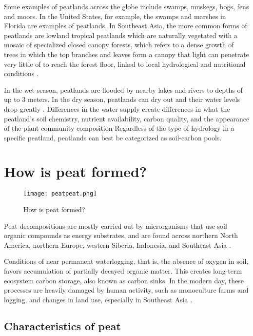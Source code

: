Some examples of peatlands across the globe include swamps, muskegs, bogs, fens and moors. In the United States, for example, the swamps and marshes in Florida are examples of peatlands. In Southeast Asia, the more common forms of peatlands are lowland tropical peatlands which are naturally vegetated with a mosaic of specialized closed canopy forests, which refers to a dense growth of trees in which the top branches and leaves form a canopy that light can penetrate very little of to reach the forest floor, linked to local hydrological and nutritional conditions \citep{chokkalingam2005fire}. 

In the wet season, peatlands are flooded by nearby lakes and rivers to depths of up to 3 meters. In the dry season, peatlands can dry out and their water levels drop greatly \citep{chokkalingam2005fire}. Differences in the water supply create differences in what the peatland's soil chemistry, nutrient availability, carbon quality, and the appearance of the plant community composition  Regardless of the type of hydrology in a specific peatland, peatlands can best be categorized as soil-carbon pools. 

\section{How is peat formed?}

\begin{figure}
\texttt{[image: peatpeat.png]}
  \caption{How is peat formed?}
  \label{fig:peatformation}
\end{figure}

Peat decompositions are mostly carried out by microrganisms that use soil organic compounds as energy substrates, and are found across northern North America, northern Europe, western Siberia, Indonesia, and Southeast Asia \citep{rezanezhad2016structure}.

Conditions of near permanent waterlogging, that is, the absence of oxygen in soil, favors accumulation of partially decayed organic matter. This creates long-term ecosystem carbon storage, also known as carbon sinks. In the modern day, these processes are heavily damaged by human activity, such as monoculture farms and logging, and changes in land use, especially in Southeast Asia \citep{page2016line}.

\subsection{Characteristics of peat}

